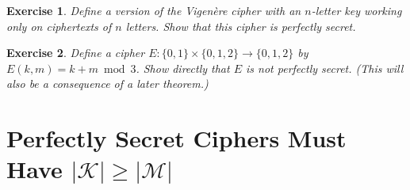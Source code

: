 \documentclass[11pt]{article}
\newtheorem{exercise}{Exercise}
\newcommand{\msgs}{\mathcal{M}}
\newcommand{\keys}{\mathcal{K}}
\newcommand{\bits}{\{0,1\}}
\begin{document}
\begin{exercise}
    Define a version of the Vigen\`{e}re cipher with an $n$-letter
    key working only on ciphertexts of $n$ letters. Show that this
    cipher is perfectly secret.
\end{exercise}

\begin{exercise}
    Define a cipher $E:\bits\times\{0,1,2\}\to\{0,1,2\}$ by $E(k,m) = k+m\bmod
    3$. Show directly that $E$ is not perfectly secret. (This will also be a
    consequence of a later theorem.)
\end{exercise}


\iffalse
\section{Perfectly Secret Ciphers Must Have $|\keys| \geq |\msgs|$}
\end{document}
